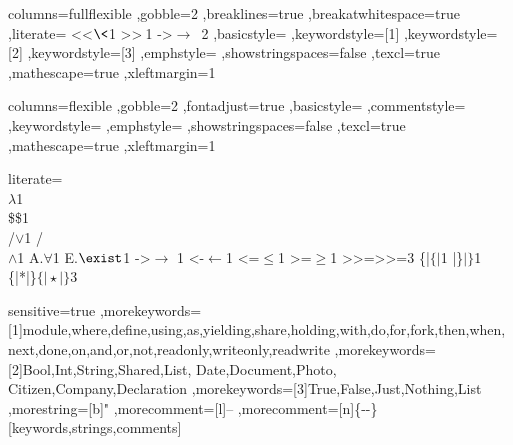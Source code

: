 

  {columns=fullflexible
  ,gobble=2
  ,breaklines=true
  ,breakatwhitespace=true
  ,literate=
    {<<}{{$\<$}}1
    {>>}{{$\>$}}1
    {->}{{$\to$\ }}2
  ,basicstyle={\sffamily}
  ,keywordstyle=[1]{\bfseries}
  ,keywordstyle=[2]{\scshape}
  ,keywordstyle=[3]{}
  ,emphstyle={\itshape}
  ,showstringspaces=false
  ,texcl=true
  ,mathescape=true
  ,xleftmargin=1\parindent
  }

  {columns=flexible
  ,gobble=2
  ,fontadjust=true
  ,basicstyle={\ttfamily\small}
  ,commentstyle={\itshape}
  ,keywordstyle={\bfseries}
  ,emphstyle={\itshape}
  ,showstringspaces=false
  ,texcl=true
  ,mathescape=true
  ,xleftmargin=1\parindent
  }

  {literate=
    {\\}{{$\lambda$}}1
    {\\\$}{{\$}}1 %
    {\\/}{{$\vee$}}1
    {/\\}{{$\wedge$}}1
    {A.}{{$\forall$}}1
    {E.}{{$\exist$}}1
    {->}{{$\rightarrow$ }}1
    {<-}{{$\leftarrow$}}1
    {<=}{{$\leq$}}1
    {>=}{{$\geq$}}1
    {>>=}{{>>=}}3 %
    {\{|}{{$\{\!|\!$}}1
    {|\}}{{$\!|\!\}$}}1
    {\{|*|\}}{{$\{\!|\!\!\star\!\!|\!\}$}}3
  }




  {sensitive=true
  ,morekeywords=[1]{module,where,define,using,as,yielding,share,holding,with,do,for,fork,then,when,next,done,on,and,or,not,readonly,writeonly,readwrite}
  ,morekeywords=[2]{Bool,Int,String,Shared,List, Date,Document,Photo, Citizen,Company,Declaration}
  ,morekeywords=[3]{True,False,Just,Nothing,List}
  ,morestring=[b]"
  ,morecomment=[l]--
  ,morecomment=[n]{\{-}{-\}}
  }[keywords,strings,comments]

